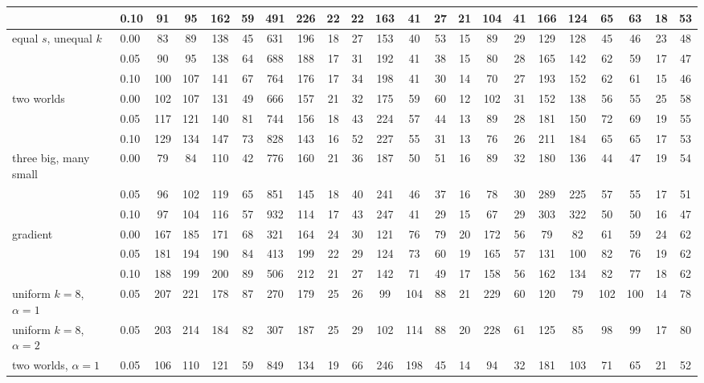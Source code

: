 \begin{table}[p]
{\begin{tabular}{llcccc|cc|cccccc|cccccccc}
 & 0.10 & 91 & 95 & 162 & 59 & 491 & 226 & 22 & 22 & 163 & 41 & 27 & 21 & 104 & 41 & 166 & 124 & 65 & 63 & 18 & 53 \\
\hline
equal $s$, unequal $k$ & 0.00 & 83 & 89 & 138 & 45 & 631 & 196 & 18 & 27 & 153 & 40 & 53 & 15 & 89 & 29 & 129 & 128 & 45 & 46 & 23 & 48 \\
 & 0.05 & 90 & 95 & 138 & 64 & 688 & 188 & 17 & 31 & 192 & 41 & 38 & 15 & 80 & 28 & 165 & 142 & 62 & 59 & 17 & 47 \\
 & 0.10 & 100 & 107 & 141 & 67 & 764 & 176 & 17 & 34 & 198 & 41 & 30 & 14 & 70 & 27 & 193 & 152 & 62 & 61 & 15 & 46 \\
\hline
two worlds & 0.00 & 102 & 107 & 131 & 49 & 666 & 157 & 21 & 32 & 175 & 59 & 60 & 12 & 102 & 31 & 152 & 138 & 56 & 55 & 25 & 58 \\
 & 0.05 & 117 & 121 & 140 & 81 & 744 & 156 & 18 & 43 & 224 & 57 & 44 & 13 & 89 & 28 & 181 & 150 & 72 & 69 & 19 & 55 \\
 & 0.10 & 129 & 134 & 147 & 73 & 828 & 143 & 16 & 52 & 227 & 55 & 31 & 13 & 76 & 26 & 211 & 184 & 65 & 65 & 17 & 53 \\
\hline
three big, many small & 0.00 & 79 & 84 & 110 & 42 & 776 & 160 & 21 & 36 & 187 & 50 & 51 & 16 & 89 & 32 & 180 & 136 & 44 & 47 & 19 & 54 \\
 & 0.05 & 96 & 102 & 119 & 65 & 851 & 145 & 18 & 40 & 241 & 46 & 37 & 16 & 78 & 30 & 289 & 225 & 57 & 55 & 17 & 51 \\
 & 0.10 & 97 & 104 & 116 & 57 & 932 & 114 & 17 & 43 & 247 & 41 & 29 & 15 & 67 & 29 & 303 & 322 & 50 & 50 & 16 & 47 \\
\hline
gradient & 0.00 & 167 & 185 & 171 & 68 & 321 & 164 & 24 & 30 & 121 & 76 & 79 & 20 & 172 & 56 & 79 & 82 & 61 & 59 & 24 & 62 \\
 & 0.05 & 181 & 194 & 190 & 84 & 413 & 199 & 22 & 29 & 124 & 73 & 60 & 19 & 165 & 57 & 131 & 100 & 82 & 76 & 19 & 62 \\
 & 0.10 & 188 & 199 & 200 & 89 & 506 & 212 & 21 & 27 & 142 & 71 & 49 & 17 & 158 & 56 & 162 & 134 & 82 & 77 & 18 & 62 \\
\hline
uniform $k{=}8$, $\alpha{=}1$ & 0.05 & 207 & 221 & 178 & 87 & 270 & 179 & 25 & 26 & 99 & 104 & 88 & 21 & 229 & 60 & 120 & 79 & 102 & 100 & 14 & 78 \\
uniform $k{=}8$, $\alpha{=}2$ & 0.05 & 203 & 214 & 184 & 82 & 307 & 187 & 25 & 29 & 102 & 114 & 88 & 20 & 228 & 61 & 125 & 85 & 98 & 99 & 17 & 80 \\
two worlds, $\alpha{=}1$ & 0.05 & 106 & 110 & 121 & 59 & 849 & 134 & 19 & 66 & 246 & 198 & 45 & 14 & 94 & 32 & 181 & 103 & 71 & 65 & 21 & 52 \\

\end{tabular}}
\end{table}
